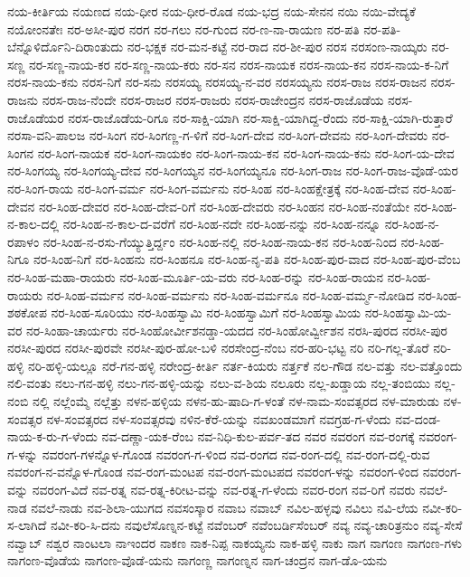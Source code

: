 ನಯ-ಕೀರ್ತಿಯ
ನಯಣದ
ನಯ-ಧೀರ
ನಯ-ಧೀರ-ರೊಡ
ನಯ-ಭದ್ರ
ನಯ-ಸೇನನ
ನಯಿ
ನಯಿ-ವೇದ್ಯಕೆ
ನಯೋಂನತೇಃ
ನರ-ಅಸೀ-ಪುರ
ನರಗ
ನರ-ಗಲು
ನರ-ಗುಂದ
ನರ-ಣ-ನಾ-ರಾಯಣ
ನರ-ಪತಿ
ನರ-ಪತಿ-ಬೆನ್ನೊಳಿರ್ದೊನಿ-ದಿರಾಂತುದು
ನರ-ಭಕ್ಷಕ
ನರ-ಮನ-ಕಟ್ಟೆ
ನರ-ರಾದ
ನರ-ಶೀ-ಪುರ
ನರಸ
ನರಸಂಣ-ನಾಯ್ಕರು
ನರ-ಸಣ್ಣ
ನರ-ಸಣ್ಣ-ನಾಯ-ಕರ
ನರ-ಸಣ್ಣ-ನಾಯ-ಕರು
ನರ-ಸನ
ನರಸ-ನಾಯಕ
ನರಸ-ನಾಯ-ಕನ
ನರಸ-ನಾಯ-ಕ-ನಿಗೆ
ನರಸ-ನಾಯ-ಕನು
ನರಸ-ನಿಗೆ
ನರ-ಸನು
ನರಸಯ್ಯ
ನರಸಯ್ಯ-ನ-ವರ
ನರಸಯ್ಯನು
ನರಸ-ರಾಜ
ನರಸ-ರಾಜನ
ನರಸ-ರಾಜನು
ನರಸ-ರಾಜ-ನೆಂದೇ
ನರಸ-ರಾಜರ
ನರಸ-ರಾಜರು
ನರಸ-ರಾಜೇಂದ್ರನ
ನರಸ-ರಾಜೊಡೆಯ
ನರಸ-ರಾಜೊಡೆಯರ
ನರಸ-ರಾಜೊಡೆಯ-ರಿಗೂ
ನರ-ಸಾಕ್ಷಿ-ಯಾಗಿ
ನರ-ಸಾಕ್ಷಿ-ಯಾಗಿದ್ದ-ರೆಂದು
ನರ-ಸಾಕ್ಷಿ-ಯಾಗಿ-ರುತ್ತಾರೆ
ನರಸಾ-ವನಿ-ಪಾಲಜ
ನರ-ಸಿಂಗ
ನರ-ಸಿಂಗಣ್ಣ-ಗ-ಳಿಗೆ
ನರ-ಸಿಂಗ-ದೇವ
ನರ-ಸಿಂಗ-ದೇವನು
ನರ-ಸಿಂಗ-ದೇವರು
ನರ-ಸಿಂಗನ
ನರ-ಸಿಂಗ-ನಾಯಕ
ನರ-ಸಿಂಗ-ನಾಯಕಂ
ನರ-ಸಿಂಗ-ನಾಯ-ಕನ
ನರ-ಸಿಂಗ-ನಾಯ-ಕನು
ನರ-ಸಿಂಗ-ಯ-ದೇವ
ನರ-ಸಿಂಗಯ್ಯ
ನರ-ಸಿಂಗಯ್ಯ-ದೇವ
ನರ-ಸಿಂಗಯ್ಯನ
ನರ-ಸಿಂಗಯ್ಯನೂ
ನರ-ಸಿಂಗ-ರಾಜ
ನರ-ಸಿಂಗ-ರಾಜ-ವೊಡೆ-ಯರ
ನರ-ಸಿಂಗ-ರಾಯ
ನರ-ಸಿಂಗ-ವರ್ಮ
ನರ-ಸಿಂಗ-ವರ್ಮನು
ನರ-ಸಿಂಹ
ನರ-ಸಿಂಹಕ್ಷೇತ್ರಕ್ಕೆ
ನರ-ಸಿಂಹ-ದೇವ
ನರ-ಸಿಂಹ-ದೇವನ
ನರ-ಸಿಂಹ-ದೇವರ
ನರ-ಸಿಂಹ-ದೇವ-ರಿಗೆ
ನರ-ಸಿಂಹ-ದೇವರು
ನರ-ಸಿಂಹನ
ನರ-ಸಿಂಹ-ನಂತೆಯೇ
ನರ-ಸಿಂಹ-ನ-ಕಾಲ-ದಲ್ಲಿ
ನರ-ಸಿಂಹ-ನ-ಕಾಲ-ದ-ವರೆಗೆ
ನರ-ಸಿಂಹ-ನದೇ
ನರ-ಸಿಂಹ-ನನ್ನು
ನರ-ಸಿಂಹ-ನನ್ನೂ
ನರ-ಸಿಂಹ-ನ-ರಪಾಳಂ
ನರ-ಸಿಂಹ-ನ-ರಸು-ಗೆಯ್ಯುತ್ತಿರ್ದ್ದಂ
ನರ-ಸಿಂಹ-ನಲ್ಲಿ
ನರ-ಸಿಂಹ-ನಾಯ-ಕನ
ನರ-ಸಿಂಹ-ನಿಂದ
ನರ-ಸಿಂಹ-ನಿಗೂ
ನರ-ಸಿಂಹ-ನಿಗೆ
ನರ-ಸಿಂಹನು
ನರ-ಸಿಂಹನೂ
ನರ-ಸಿಂಹ-ನೃ-ಪತಿ
ನರ-ಸಿಂಹ-ಪುರ-ವಾದ
ನರ-ಸಿಂಹ-ಪುರ-ವೆಂಬ
ನರ-ಸಿಂಹ-ಮಹಾ-ರಾಯರು
ನರ-ಸಿಂಹ-ಮೂರ್ತಿ-ಯ-ವರು
ನರ-ಸಿಂಹ-ರನ್ನು
ನರ-ಸಿಂಹ-ರಾಯನ
ನರ-ಸಿಂಹ-ರಾಯರು
ನರ-ಸಿಂಹ-ವರ್ಮನ
ನರ-ಸಿಂಹ-ವರ್ಮನು
ನರ-ಸಿಂಹ-ವರ್ಮನೂ
ನರ-ಸಿಂಹ-ವರ್ಮ್ಮ-ನೋಡಿದ
ನರ-ಸಿಂಹ-ಶಠಕೋಪ
ನರ-ಸಿಂಹ-ಸೂರಿಯು
ನರ-ಸಿಂಹಸ್ವಾಮಿ
ನರ-ಸಿಂಹಸ್ವಾಮಿಗೆ
ನರ-ಸಿಂಹಸ್ವಾಮಿಯ
ನರ-ಸಿಂಹಸ್ವಾಮಿ-ಯ-ವರ
ನರ-ಸಿಂಹಾ-ಚಾರ್ಯರು
ನರ-ಸಿಂಹೋರ್ವೀಶನಡ್ಡಾ-ಯದದ
ನರ-ಸಿಂಹೋರ್ವ್ವೀಶನ
ನರಸಿ-ಪುರದ
ನರಸೀ-ಪುರ
ನರಸೀ-ಪುರದ
ನರಸೀ-ಪುರವೇ
ನರಸೀ-ಪುರ-ಹೋ-ಬಳಿ
ನರಸೇಂದ್ರ-ನೆಂಬ
ನರ-ಹರಿ-ಭಟ್ಟ
ನರಿ
ನರಿ-ಗಲ್ಲ-ತೊರೆ
ನರಿ-ಹಳ್ಳಿ
ನರಿ-ಹಳ್ಳಿ-ಯಲ್ಲೂ
ನರೆ-ಗನ-ಹಳ್ಳಿ
ನರೇಂದ್ರ-ಕೀರ್ತಿ
ನರ್ತ-ಕಿಯರು
ನರ್ತ್ತಕೆ
ನಲ-ಗೌಡ
ನಲ-ವತ್ತು
ನಲ-ವತ್ತೊಂದು
ನಲಿ-ವಂತು
ನಲು-ಗನ-ಹಳ್ಳಿ
ನಲು-ಗನ-ಹಳ್ಳಿ-ಯನ್ನು
ನಲು-ವ-ಶಿಯ
ನಲೂರು
ನಲ್ಲ-ಖಡ್ಡಾಯ
ನಲ್ಲ-ತಂಬಿಯು
ನಲ್ಲ-ನಂಬಿ
ನಲ್ಲಿ
ನಲ್ಲೆಂಮ್ಮೆ
ನಲ್ಲೆತ್ತು
ನಳನ-ಹಳ್ಳಿಯ
ನಳನ-ಹು-ಷಾದಿ-ಗ-ಳಂತೆ
ನಳ-ನಾಮ-ಸಂವತ್ಸರದ
ನಳ-ಮಾರುಡು
ನಳ-ಸಂವತ್ಸರ
ನಳ-ಸಂವತ್ಸರದ
ನಳ-ಸಂವತ್ಸರವು
ನಳಿನ-ಕೆರೆ-ಯನ್ನು
ನವಖಂಡಮಾಗೆ
ನವಗ್ರಹ-ಗ-ಳೆಂದು
ನವ-ದಂಡ-ನಾಯ-ಕ-ರು-ಗ-ಳೆಂದು
ನವ-ದಣ್ಣಾ-ಯಕ-ರೆಂಬ
ನವ-ನಿಧಿ-ಕುಲ-ಪರ್ವ-ತದ
ನವರ
ನವರಂಗ
ನವ-ರಂಗಕ್ಕೆ
ನವರಂಗ-ಗ-ಳನ್ನು
ನವರಂಗ-ಗಳನ್ನೊಳ-ಗೊಂಡ
ನವರಂಗ-ಗ-ಳಿಂದ
ನವ-ರಂಗದ
ನವ-ರಂಗ-ದಲ್ಲಿ
ನವ-ರಂಗ-ದಲ್ಲಿ-ರುವ
ನವರಂಗ-ನ-ವನ್ನೊಳ-ಗೊಂಡ
ನವ-ರಂಗ-ಮಂಟಪ
ನವ-ರಂಗ-ಮಂಟಪದ
ನವರಂಗ-ಳನ್ನು
ನವರಂಗ-ಳಿಂದ
ನವರಂಗ-ವನ್ನು
ನವರಂಗ-ವಿದೆ
ನವ-ರತ್ನ
ನವ-ರತ್ನ-ಕಿರೀಟ-ವನ್ನು
ನವ-ರತ್ನ-ಗ-ಳೆಂದು
ನವರ-ರಂಗ
ನವ-ರಿಗೆ
ನವರು
ನವಲೆ-ನಾಡ
ನವಲೆ-ನಾಡು
ನವ-ಶಿಲಾ-ಯುಗದ
ನವಸಂಸ್ಕಾರ
ನವಾಬ
ನವಾಬ್
ನವಿಲ-ಹಳ್ಳವು
ನವಿಲು
ನವಿ-ಲೆಯ
ನವೀ-ಕರಿ-ಸ-ಲಾಗಿದೆ
ನವೀ-ಕರಿ-ಸಿ-ದನು
ನವುಲೆಸೊಣ್ನನ-ಕಟ್ಟೆ
ನವೆಂಬರ್
ನವೆಂಬರ್ಡಿಸೆಂಬರ್
ನವ್ಯ
ನವ್ಯ-ಚಾರಿತ್ರನುಂ
ನವ್ಯ-ಸೇಸೆ
ನವ್ವಾಬ್
ನಶ್ವರ
ನಾಂಟಲಾ
ನಾಇಂದರ
ನಾಕಣ
ನಾಕ-ನಿಪ್ಪ
ನಾಕಯ್ಯನು
ನಾಕ-ಹಳ್ಳಿ
ನಾಕು
ನಾಗ
ನಾಗಂಣ
ನಾಗಂಣ-ಗಳು
ನಾಗಂಣ-ವೊಡೆಯ
ನಾಗಂಣ-ವೊಡೆ-ಯನು
ನಾಗಂಣ್ಣ
ನಾಗಂಣ್ನನ
ನಾಗ-ಚಂದ್ರನ
ನಾಗ-ಡೊ-ಯನು
